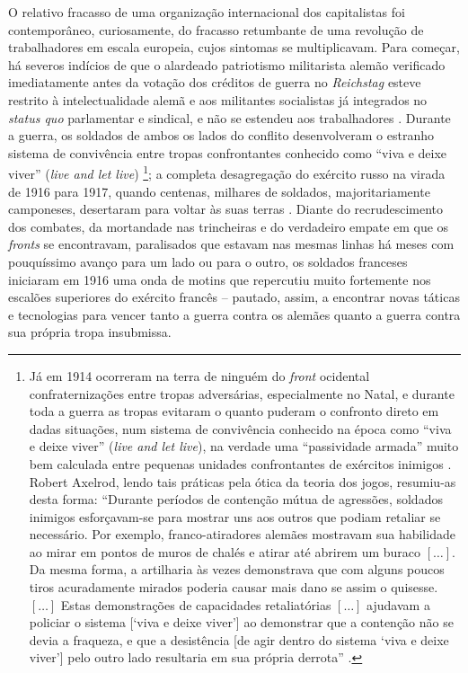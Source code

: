 O relativo fracasso de uma organização internacional dos capitalistas foi contemporâneo, curiosamente, do fracasso retumbante de uma revolução de trabalhadores em escala europeia, cujos sintomas se multiplicavam. Para começar, há severos indícios de que o alardeado patriotismo militarista alemão verificado imediatamente antes da votação dos créditos de guerra no \textit{Reichstag} esteve restrito à intelectualidade alemã e aos militantes socialistas já integrados no \textit{status quo} parlamentar e sindical, e não se estendeu aos trabalhadores \cite{broue_german_2005,watson_german_2011}. Durante a guerra, os soldados de ambos os lados do conflito desenvolveram o estranho sistema de convivência entre tropas confrontantes conhecido como ``viva e deixe viver'' (\textit{live and let live}) \cite{ashworth_live_1980}\footnote{Já em 1914 ocorreram na terra de ninguém do \textit{front} ocidental confraternizações entre tropas adversárias, especialmente no Natal, e durante toda a guerra as tropas evitaram o quanto puderam o confronto direto em dadas situações, num sistema de convivência conhecido na época como ``viva e deixe viver'' (\textit{live and let live}), na verdade uma ``passividade armada'' muito bem calculada entre pequenas unidades confrontantes de exércitos inimigos \cite{ashworth_live_1980}. Robert Axelrod, lendo tais práticas pela ótica da teoria dos jogos, resumiu-as desta forma: ``Durante períodos de contenção mútua de agressões, soldados inimigos esforçavam-se para mostrar uns aos outros que podiam retaliar se necessário. Por exemplo, franco-atiradores alemães mostravam sua habilidade ao mirar em pontos de muros de chalés e atirar até abrirem um buraco \([\dots]\). Da mesma forma, a artilharia às vezes demonstrava que com alguns poucos tiros acuradamente mirados poderia causar mais dano se assim o quisesse. \([\dots]\) Estas demonstrações de capacidades retaliatórias \([\dots]\) ajudavam a policiar o sistema [‘viva e deixe viver’] ao demonstrar que a contenção não se devia a fraqueza, e que a desistência [de agir dentro do sistema ‘viva e deixe viver’] pelo outro lado resultaria em sua própria derrota'' \cite[p.~79-80]{axelrod_cooperation_2006}.}; a completa desagregação do exército russo na virada de 1916 para 1917, quando centenas, milhares de soldados, majoritariamente camponeses, desertaram para voltar às suas terras \cite{trotsky_revrus01_1977}. Diante do recrudescimento dos combates, da mortandade nas trincheiras e do verdadeiro empate em que os \textit{fronts} se encontravam, paralisados que estavam nas mesmas linhas há meses com pouquíssimo avanço para um lado ou para o outro, os soldados franceses iniciaram em 1916 uma onda de motins \cite{masson_franceses_2008} que repercutiu muito fortemente nos escalões superiores do exército francês -- pautado, assim, a encontrar novas táticas e tecnologias para vencer tanto a guerra contra os alemães quanto a guerra contra sua própria tropa insubmissa. 

